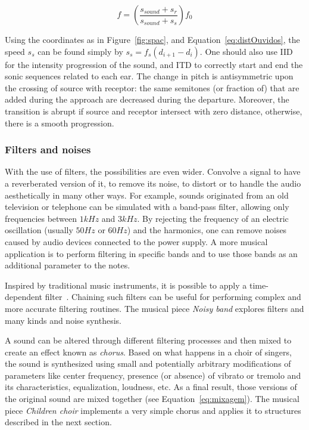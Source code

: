 \begin{equation}\label{eq:fDoppler}
    f=\left(\frac{s_{sound}+s_r}{s_{sound}+s_s}\right)f_0
\end{equation}

Using the coordinates as in Figure~\ref{fig:spac},
and Equation~\ref{eq:distOuvidos},
the speed $s_s$ can be found simply by $s_s = f_s(d_{i+1}-d_{i})$.
One should also use IID for the intensity progression of the sound,
and ITD to correctly start and end the sonic
sequences related to each ear.
The change in pitch is antisymmetric
upon the crossing of source with receptor:
the same semitones (or fraction of) that are added during the approach are decreased during the departure.
Moreover, the transition is abrupt if source and receptor intersect with zero distance, otherwise, there is a smooth progression.


\subsubsection{Filters and noises}
With the use of filters, the possibilities are even wider.
Convolve a signal to have a reverberated version of it, to remove its noise, to distort or to handle
the audio aesthetically in many other ways. For example, sounds originated from an old television or telephone can be simulated with a band-pass filter, allowing only frequencies between $1kHz$ and $3kHz$. By rejecting the frequency of an electric oscillation (usually $50Hz$ or $60Hz$) and the harmonics, one can remove noises caused by audio devices connected to the power supply. A more musical application is to perform filtering in specific bands and to use those bands as an additional parameter to the notes.

Inspired by traditional music instruments, it is possible to apply a
time-dependent filter~\cite{Roederer}. Chaining such filters can be useful for performing complex and more accurate filtering routines. The musical piece \emph{Noisy band} explores filters and many kinds and noise synthesis.~\cite{MASSA}

A sound can be altered through different filtering processes and then mixed to create an effect known as \emph{chorus}. Based on what happens in a choir of singers, the sound is synthesized using small and potentially arbitrary modifications of parameters like center frequency, presence (or absence) of vibrato or tremolo and its characteristics, equalization, loudness, etc. As a final result, those versions of the original sound are mixed together (see Equation~\ref{eq:mixagem}).
The musical piece \emph{Children choir} implements a very simple chorus
and applies it to structures described in the next section.~\cite{MASSA}

